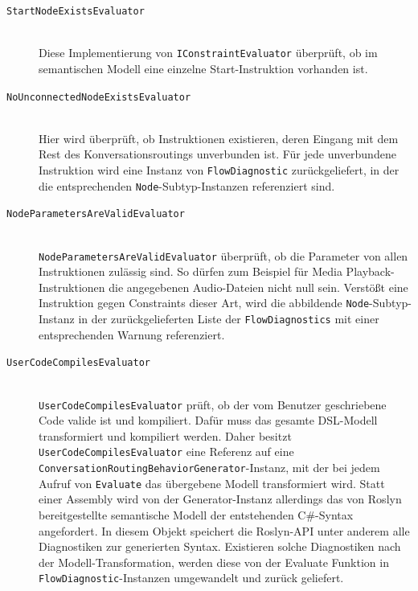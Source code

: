 \begin{description}
\item[\texttt{StartNodeExistsEvaluator}] \hfill \\
Diese Implementierung von \texttt{IConstraintEvaluator} überprüft, ob im semantischen Modell eine einzelne Start-Instruktion vorhanden ist.
\item[\texttt{NoUnconnectedNodeExistsEvaluator}] \hfill \\
Hier wird überprüft, ob Instruktionen existieren, deren Eingang mit dem Rest des Konversationsroutings unverbunden ist. Für jede unverbundene Instruktion wird eine Instanz von \texttt{FlowDiagnostic} zurückgeliefert, in der die entsprechenden \texttt{Node}-Subtyp-Instanzen referenziert sind.
\item[\texttt{NodeParametersAreValidEvaluator}] \hfill \\
\texttt{NodeParametersAreValidEvaluator} überprüft, ob die Parameter von allen Instruktionen zulässig sind. So dürfen zum Beispiel für Media Playback-Instruktionen die angegebenen Audio-Dateien nicht null sein. Verstößt eine Instruktion gegen Constraints dieser Art, wird die abbildende \texttt{Node}-Subtyp-Instanz in der zurückgelieferten Liste der \texttt{FlowDiagnostics} mit einer entsprechenden Warnung referenziert.
\item[\texttt{UserCodeCompilesEvaluator}] \hfill \\
\texttt{UserCodeCompilesEvaluator} prüft, ob der vom Benutzer geschriebene Code valide ist und kompiliert. Dafür muss das gesamte DSL-Modell transformiert und kompiliert werden. Daher besitzt \texttt{UserCodeCompilesEvaluator} eine Referenz auf eine \texttt{ConversationRoutingBehaviorGenerator}-Instanz, mit der bei jedem Aufruf von \texttt{Evaluate} das übergebene Modell transformiert wird. Statt einer Assembly wird von der Generator-Instanz allerdings das von Roslyn bereitgestellte semantische Modell der entstehenden C\#-Syntax angefordert. In diesem Objekt speichert die Roslyn-API unter anderem alle Diagnostiken zur generierten Syntax. Existieren solche Diagnostiken nach der Modell-Transformation, werden diese von der Evaluate Funktion in \texttt{FlowDiagnostic}-Instanzen umgewandelt und zurück geliefert.
\end{description}

